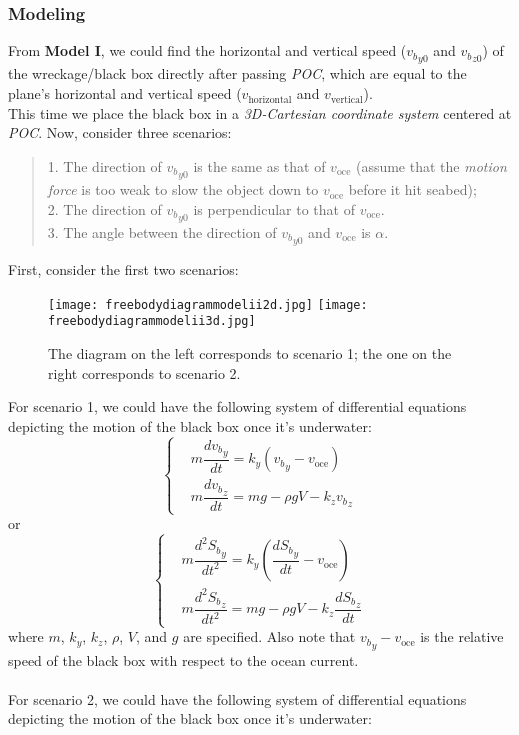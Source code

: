 \documentclass[a4paper,11pt]{article}
\begin{document}
\begin{spacing}{1.0}
\subsubsection{Modeling}
From \textbf{Model I}, we could find the horizontal and vertical speed (${v_b}_{y0}$ and ${v_b}_{z0}$) of the wreckage/black box directly after passing \textit{POC}, which are equal to the plane's horizontal and vertical speed ($v_\text{horizontal}$ and $v_\text{vertical}$). 
\\This time we place the black box in a \textit{3D-Cartesian coordinate system} centered at \textit{POC}. Now, consider three scenarios:
\begin{quote}
	1. The direction of ${v_b}_{y0}$ is the same as that of $v_\text{oce}$ (assume that the \textit{motion force} is too weak to slow the object down to $v_\text{oce}$ before it hit seabed);
	\\2. The direction of ${v_b}_{y0}$ is perpendicular to that of $v_\text{oce}$.
	\\3. The angle between the direction of ${v_b}_{y0}$ and $v_\text{oce}$ is $\alpha$.
\end{quote}
First, consider the first two scenarios:
\begin{figure}[H]
	\centering
	\texttt{[image: freebodydiagrammodelii2d.jpg]}
	\texttt{[image: freebodydiagrammodelii3d.jpg]}
	\caption{The diagram on the left corresponds to scenario 1; the one on the right corresponds to scenario 2.}
\end{figure}
\noindent For scenario 1, we could have the following system of differential equations depicting the motion of the black box once it's underwater:
\[
\left\{
\begin{aligned}
& m\dfrac{d{v_b}_y}{dt} = k_y({v_b}_y - v_\text{oce})
\\& m\dfrac{d{v_b}_z}{dt} = mg - \rho g V - k_z {v_b}_z
\end{aligned}
\right.
\]
or
\[
\left\{
\begin{aligned}
& m\dfrac{d^2{S_b}_y}{dt^2} = k_y(\dfrac{d{S_b}_y}{dt} - v_\text{oce})
\\& m\dfrac{d^2{S_b}_z}{dt^2} = mg - \rho g V - k_z \dfrac{d{S_b}_z}{dt}
\end{aligned}
\right.
\]
where $m$, $k_y$, $k_z$, $\rho$, $V$, and $g$ are specified. Also note that ${v_b}_y - v_\text{oce}$ is the relative speed of the black box with respect to the ocean current.
\\~
\\For scenario 2, we could have the following system of differential equations depicting the motion of the black box once it's underwater:

\end{spacing}
\end{document}
